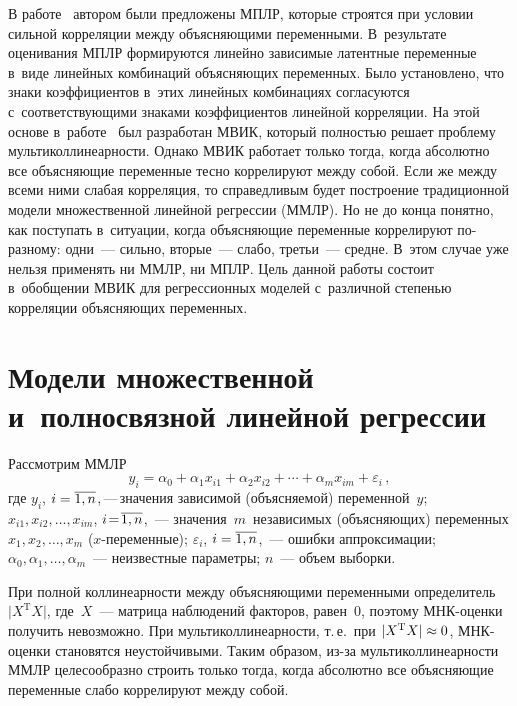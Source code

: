 \begin{multicols}{2}
  В работе~\cite{8-baz} автором были предложены МПЛР, которые строятся при условии сильной 
корреляции между объясняющими переменными. В~результате оценивания 
МПЛР формируются линейно зависимые латентные переменные в~виде 
линейных комбинаций объясняющих переменных. Было установлено, что знаки 
коэффициентов в~этих линейных комбинациях согласуются 
с~соответствующими знаками коэффициентов линейной корреляции. На этой 
основе в~работе~\cite{9-baz} был разработан МВИК, который пол\-ностью решает проб\-ле\-му 
мультиколлинеарности. Однако МВИК работает только тогда, когда абсолютно 
все объясняющие переменные тес\-но коррелируют между собой. Если же между 
всеми ними слабая корреляция, то справедливым будет по\-стро\-ение 
традиционной модели множественной линейной регрессии (ММЛР). Но не до 
конца понятно, как поступать в~ситуации, когда объясняющие переменные 
коррелируют по-раз\-но\-му: одни~--- сильно, вторые~--- слабо, третьи~--- 
средне. В~этом случае уже нельзя применять ни ММЛР, ни МПЛР. Цель 
данной работы состоит в~обобщении МВИК для регрессионных моделей 
с~различной степенью корреляции объясняющих переменных.

\section{Модели множественной и~полносвязной линейной 
регрессии}
  
  Рассмотрим ММЛР
  \begin{equation}
  y_i= \alpha_0+\alpha_1 x_{i1} +\alpha_2 x_{i2}+\cdots + \alpha_m 
x_{im}+\varepsilon_i\,,
  \label{e1-baz}
  \end{equation}
где $y_i$, $i\hm=\overline{1,n}$,\,---\,значения зависимой (объяс\-ня\-емой) 
переменной~$y$; $x_{i1}, x_{i2}, \ldots , x_{im}$, $i\!\hm=\!\overline{1,n}$,~--- 
значения~$m$~независимых (объясняющих) пе\-ре\-мен\-ных $x_1, x_2, \ldots , 
x_m$ ($x$-пе\-ре\-мен\-ные); $\varepsilon_i$, $i\hm= \overline{1,n}$,~--- ошибки 
аппроксимации; $\alpha_0, \alpha_1, \ldots , \alpha_m$~--- неизвестные 
параметры; $n$~--- объем выборки.

  При полной коллинеарности между объяс\-ня\-ющи\-ми переменными 
определитель $\vert X^{\mathrm{T}} X\vert$, где~$X$~--- мат\-ри\-ца наблюдений факторов, 
равен~0, поэтому МНК-оцен\-ки получить невозможно. При 
мультиколлинеарности, т.\,е.\ при $\vert X^{\mathrm{T}} X\vert \hm\approx 0$,  
МНК-оцен\-ки становятся неустойчивыми. Таким образом, из-за 
мультиколлинеарности ММЛР целесообразно строить только тогда, когда 
абсолютно все объясняющие переменные слабо коррелируют между собой.
  

\end{multicols}
